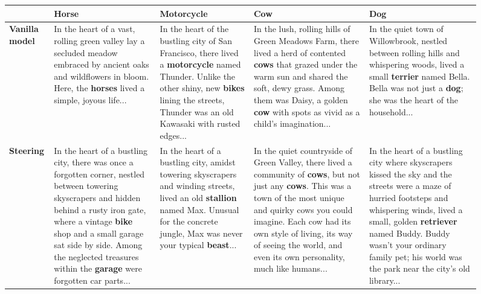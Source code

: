 \begin{figure}[t]
    \centering
    \setlength{\tabcolsep}{4pt}
    \renewcommand{\arraystretch}{1.3}
    \scriptsize
    \begin{tabular}{p{} p{} p{} p{} p{}}
        & \textbf{Horse} & \textbf{Motorcycle} & \textbf{Cow} & \textbf{Dog} \\
        \midrule
        \textbf{Vanilla model} &
        In the heart of a vast, rolling green valley lay a secluded meadow embraced by ancient oaks and wildflowers in bloom. Here, the \textbf{horses} lived a simple, joyous life... &
        In the heart of the bustling city of San Francisco, there lived a \textbf{motorcycle} named Thunder. Unlike the other shiny, new \textbf{bikes} lining the streets, Thunder was an old Kawasaki with rusted edges... &
        In the lush, rolling hills of Green Meadows Farm, there lived a herd of contented \textbf{cows} that grazed under the warm sun and shared the soft, dewy grass. Among them was Daisy, a golden \textbf{cow} with spots as vivid as a child's imagination... &
        In the quiet town of Willowbrook, nestled between rolling hills and whispering woods, lived a small \textbf{terrier} named Bella. Bella was not just a \textbf{dog}; she was the heart of the household... \\
        \midrule
        \textbf{Steering} &
        In the heart of a bustling city, there was once a forgotten corner, nestled between towering skyscrapers and hidden behind a rusty iron gate, where a vintage \textbf{bike} shop and a small garage sat side by side. Among the neglected treasures within the \textbf{garage} were forgotten car parts... &
        In the heart of a bustling city, amidst towering skyscrapers and winding streets, lived an old \textbf{stallion} named Max. Unusual for the concrete jungle, Max was never your typical \textbf{beast}... &
        In the quiet countryside of Green Valley, there lived a community of \textbf{cows}, but not just any \textbf{cows}. This was a town of the most unique and quirky cows you could imagine. Each cow had its own style of living, its way of seeing the world, and even its own personality, much like humans... &
        In the heart of a bustling city where skyscrapers kissed the sky and the streets were a maze of hurried footsteps and whispering winds, lived a small, golden \textbf{retriever} named Buddy. Buddy wasn't your ordinary family pet; his world was the park near the city’s old library... \\

\end{tabular}
\end{figure}
